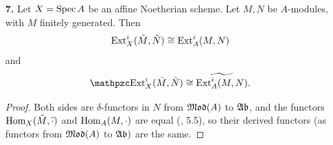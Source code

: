 \documentclass[a4paper]{article}
\begin{document}
\begin{enumerate} [label=\textbf{\arabic*.}, leftmargin=0em]
\begin{proof}
\begin{itemize} [leftmargin=0cm]
                  Continuing on to our main problem, let $M$ be a finitely generated $A$-module, and suppose $\Ext^i(M, A) = 0$ for all $i > n$.
                  Let $P_\bullet \to M \to 0$ be any projective resolution of $M$, and consider the exact sequence
                  \[ \begin{tikzcd}
                      0 \arrow[r] & N \arrow[r] & P_{n - 1} \arrow[r] & \cdots \arrow[r] & P_0 \arrow[r] & M \arrow[r] & 0
                    \end{tikzcd} \]
                  where $N$ is the image of $P_{n + 1} \to P_n$.
                  Applying Lemma 1 with $F = \Hom(\cdot, A)$ and $i = n + 1$ so that $\dR^iF = \Ext^i(\cdot, A)$, one has an isomorphism
                  \begin{equation*}
                    \Ext^{n + 1}(M, A) \cong \Ext^1(N, A).
                  \end{equation*}
                  But $\Ext^{n + 1}(M, A) = 0$, so $N$ is projective by (a).
                  Hence, $\pd{M} \leq n$.
          \end{itemize}
        \end{proof}

  \item[\textbf{7.}] Let $X = \operatorname{Spec}{A}$ be an affine Noetherian scheme. Let $M, N$ be $A$-modules, with $M$ finitely generated. Then
        \begin{equation*}
          \operatorname{Ext}_X^i(\tilde{M}, \tilde{N}) \cong \operatorname{Ext}_A^i(M, N)
        \end{equation*}
        and
        \begin{equation*}
          \rExt_X^i(\tilde{M}, \tilde{N}) \cong \widetilde{\Ext_A^i(M, N)}.
        \end{equation*}

        \begin{proof}
          Both sides are $\delta$-functors in $N$ from $\mathfrak{Mod}(A)$ to $\mathfrak{Ab}$, and the functors $\operatorname{Hom}_X(\tilde{M}, \tilde{\cdot})$ and $\operatorname{Hom}_A(M, \cdot)$ are equal (, 5.5), so their derived functors (as functors from $\mathfrak{Mod}(A)$ to $\mathfrak{Ab})$ are the same.


\end{proof}
\end{enumerate}
\end{document}
